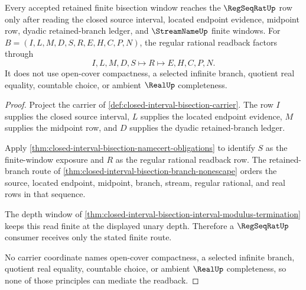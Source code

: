 \begin{theorem}
\label{thm:closed-interval-bisection-regseqrat-route}
Every accepted retained finite bisection window reaches the $\RegSeqRatUp$ row only after reading the closed source interval, located endpoint evidence, midpoint row, dyadic retained-branch ledger, and $\StreamNameUp$ finite windows. For $B=(I,L,M,D,S,R,E,H,C,P,N)$, the regular rational readback factors through
$$
I,L,M,D,S \longmapsto R \longmapsto E,H,C,P,N .
$$
It does not use open-cover compactness, a selected infinite branch, quotient real equality, countable choice, or ambient $\RealUp$ completeness.
\end{theorem}
\begin{proof}
Project the carrier of \autoref{def:closed-interval-bisection-carrier}. The row $I$ supplies the closed source interval, $L$ supplies the located endpoint evidence, $M$ supplies the midpoint row, and $D$ supplies the dyadic retained-branch ledger.

Apply \autoref{thm:closed-interval-bisection-namecert-obligations} to identify $S$ as the finite-window exposure and $R$ as the regular rational readback row. The retained-branch route of \autoref{thm:closed-interval-bisection-branch-nonescape} orders the source, located endpoint, midpoint, branch, stream, regular rational, and real rows in that sequence.

The depth window of \autoref{thm:closed-interval-bisection-interval-modulus-termination} keeps this read finite at the displayed unary depth. Therefore a $\RegSeqRatUp$ consumer receives only the stated finite route.

No carrier coordinate names open-cover compactness, a selected infinite branch, quotient real equality, countable choice, or ambient $\RealUp$ completeness, so none of those principles can mediate the readback.
\end{proof}



